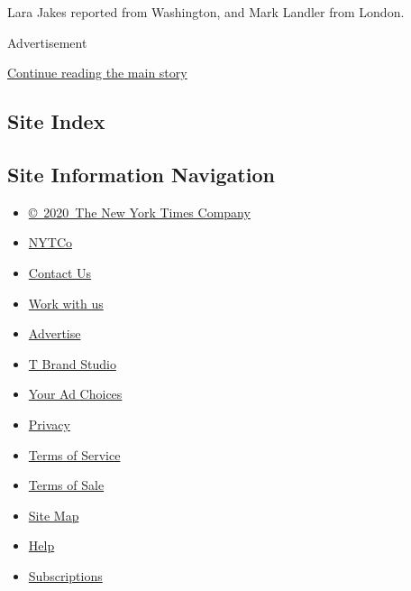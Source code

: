 Lara Jakes reported from Washington, and Mark Landler from London.

Advertisement

\protect\hyperlink{after-bottom}{Continue reading the main story}

\hypertarget{site-index}{%
\subsection{Site Index}\label{site-index}}

\hypertarget{site-information-navigation}{%
\subsection{Site Information
Navigation}\label{site-information-navigation}}

\begin{itemize}
\tightlist
\item
  \href{https://help.nytimes3xbfgragh.onion/hc/en-us/articles/115014792127-Copyright-notice}{©~2020~The
  New York Times Company}
\end{itemize}

\begin{itemize}
\tightlist
\item
  \href{https://www.nytco.com/}{NYTCo}
\item
  \href{https://help.nytimes3xbfgragh.onion/hc/en-us/articles/115015385887-Contact-Us}{Contact
  Us}
\item
  \href{https://www.nytco.com/careers/}{Work with us}
\item
  \href{https://nytmediakit.com/}{Advertise}
\item
  \href{http://www.tbrandstudio.com/}{T Brand Studio}
\item
  \href{https://www.nytimes3xbfgragh.onion/privacy/cookie-policy\#how-do-i-manage-trackers}{Your
  Ad Choices}
\item
  \href{https://www.nytimes3xbfgragh.onion/privacy}{Privacy}
\item
  \href{https://help.nytimes3xbfgragh.onion/hc/en-us/articles/115014893428-Terms-of-service}{Terms
  of Service}
\item
  \href{https://help.nytimes3xbfgragh.onion/hc/en-us/articles/115014893968-Terms-of-sale}{Terms
  of Sale}
\item
  \href{https://spiderbites.nytimes3xbfgragh.onion}{Site Map}
\item
  \href{https://help.nytimes3xbfgragh.onion/hc/en-us}{Help}
\item
  \href{https://www.nytimes3xbfgragh.onion/subscription?campaignId=37WXW}{Subscriptions}
\end{itemize}
